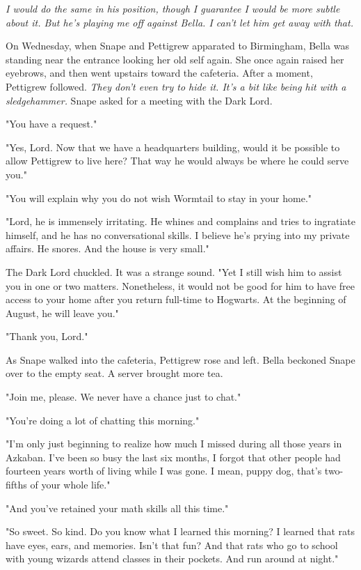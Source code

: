 \documentclass[a4paper,11pt]{article}
\begin{document}
\emph{I would do the same in his position, though I guarantee I would be more subtle about it. But he's playing me off against Bella. I can't let him get away with that.}

On Wednesday, when Snape and Pettigrew apparated to Birmingham, Bella was standing near the entrance looking her old self again. She once again raised her eyebrows, and then went upstairs toward the cafeteria. After a moment, Pettigrew followed. \emph{They don't even try to hide it. It's a bit like being hit with a sledgehammer.} Snape asked for a meeting with the Dark Lord.

"You have a request."

"Yes, Lord. Now that we have a headquarters building, would it be possible to allow Pettigrew to live here? That way he would always be where he could serve you."

"You will explain why you do not wish Wormtail to stay in your home."

"Lord, he is immensely irritating. He whines and complains and tries to ingratiate himself, and he has no conversational skills. I believe he's prying into my private affairs. He snores. And the house is very small."

The Dark Lord chuckled. It was a strange sound. "Yet I still wish him to assist you in one or two matters. Nonetheless, it would not be good for him to have free access to your home after you return full-time to Hogwarts. At the beginning of August, he will leave you."

"Thank you, Lord."

As Snape walked into the cafeteria, Pettigrew rose and left. Bella beckoned Snape over to the empty seat. A server brought more tea.

"Join me, please. We never have a chance just to chat."

"You're doing a lot of chatting this morning."

"I'm only just beginning to realize how much I missed during all those years in Azkaban. I've been so busy the last six months, I forgot that other people had fourteen years worth of living while I was gone. I mean, puppy dog, that's two-fifths of your whole life."

"And you've retained your math skills all this time."

"So sweet. So kind. Do you know what I learned this morning? I learned that rats have eyes, ears, and memories. Isn't that fun? And that rats who go to school with young wizards attend classes in their pockets. And run around at night."
\end{document}
